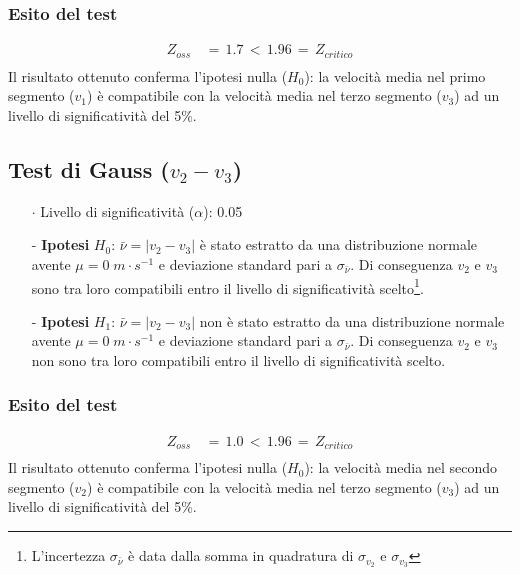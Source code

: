\documentclass{article}
\begin{document}
\subsubsection{Esito del test}
\begin{equation*}
\begin{split}
    Z_{oss} \,&= \,1.7 \,< \,1.96 \,= \,Z_{critico} \\[0.2cm]
\end{split}
\end{equation*}
Il risultato ottenuto conferma l'ipotesi nulla ($H_0$): la velocità media nel primo segmento ($v_1$) è compatibile con la velocità media nel terzo segmento ($v_3$) ad un livello di significatività del 5\%.
\vspace{0.3cm}

\subsection{Test di Gauss ($v_2 - v_3$)}
\begin{itemize}
    \item [$\cdot$] Livello di significatività ($\alpha$): 0.05
    \item [-] \textbf{Ipotesi} $H_0$: $\bar{\nu} = |v_2 - v_3|$ è stato estratto da una distribuzione normale avente $\mu = 0\;m\cdot s^{-1}$ e deviazione standard pari a $\sigma_{\bar{\nu}}$. Di conseguenza $v_2$ e $v_3$ sono tra loro compatibili entro il livello di significatività scelto\footnote{L'incertezza $\sigma_{\bar{\nu}}$ è data dalla somma in quadratura di $\sigma_{v_2}$ e $\sigma_{v_3}$}.
    \item [-] \textbf{Ipotesi} $H_1$: $\bar{\nu} = |v_2 - v_3|$ non è stato estratto da una distribuzione normale avente $\mu = 0\;m\cdot s^{-1}$ e deviazione standard pari a $\sigma_{\bar{\nu}}$. Di conseguenza $v_2$ e $v_3$ non sono tra loro compatibili entro il livello di significatività scelto.
\end{itemize}
\subsubsection{Esito del test}
\begin{equation*}
\begin{split}
    Z_{oss} \,&= \,1.0 \,< \,1.96 \,= \,Z_{critico} \\[0.2cm]
\end{split}
\end{equation*}
Il risultato ottenuto conferma l'ipotesi nulla ($H_0$): la velocità media nel secondo segmento ($v_2$) è compatibile con la velocità media nel terzo segmento ($v_3$) ad un livello di significatività del 5\%.
\end{document}
